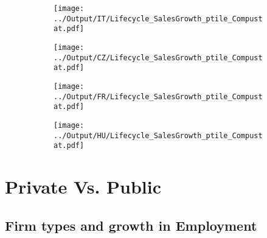 \documentclass[12pt,notitlepage]{article}
\begin{document}
\begin{figure}[!htpb]
\centering
\caption{Sales Growth (Percentile)}
\begin{subfigure}{.49\textwidth}
    \centering
 \texttt{[image: ../Output/IT/Lifecycle\_SalesGrowth\_ptile\_Compustat.pdf]}
\end{subfigure}%
\begin{subfigure}{.49\textwidth}
    \centering
 \texttt{[image: ../Output/CZ/Lifecycle\_SalesGrowth\_ptile\_Compustat.pdf]}
\end{subfigure}
\begin{subfigure}{.49\textwidth}
    \centering
 \texttt{[image: ../Output/FR/Lifecycle\_SalesGrowth\_ptile\_Compustat.pdf]}
\end{subfigure}%
\begin{subfigure}{.49\textwidth}
    \centering
 \texttt{[image: ../Output/HU/Lifecycle\_SalesGrowth\_ptile\_Compustat.pdf]}
\end{subfigure}
\end{figure}
\pagebreak





\appendix

\FloatBarrier
\section{Private Vs. Public} %
\label{sec:private_vs_public}
\FloatBarrier



\subsection{Firm types and growth in Employment}
\end{document}
